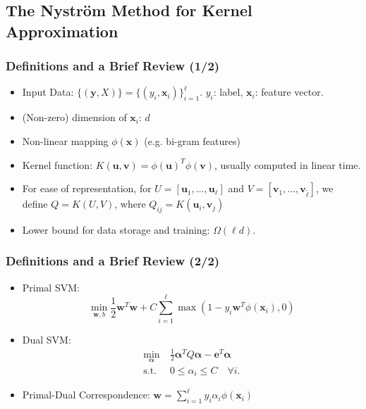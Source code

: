 \documentclass{beamer}
\def\bw{{\boldsymbol w}}
\def\bu{{\boldsymbol u}}
\def\balpha{{\boldsymbol \alpha}}
\def\be{{\boldsymbol e}}
\def\bx{{\boldsymbol x}}
\def\by{{\boldsymbol y}}
\def\bv{{\boldsymbol v}}
\begin{document}
\subsection{The Nystr\"om Method for Kernel Approximation}
\begin{frame}
  \frametitle{Definitions and a Brief Review (1/2)}
  \begin{itemize}
    \item Input Data: $\{(\by, X)\} = \{(y_i, \bx_i)\}_{i=1}^\ell$. $y_i$: label, $\bx_i$: feature vector.
    \item (Non-zero) dimension of $\bx_i$: $d$
    \item Non-linear mapping $\phi(\bx)$ (e.g. bi-gram features)
    \item Kernel function: $K(\bu, \bv) = \phi(\bu)^T \phi(\bv)$, usually computed in linear time.
    \item For ease of representation, for $U = [\bu_1, \dots, \bu_\ell]$ and $V = [\bv_1, \dots, \bv_{\tilde{\ell}}]$, we define $Q = K(U, V)$, where $Q_{ij} = K(\bu_i, \bv_j)$
    \pause
    \item Lower bound for data storage and training: $\Omega(\ell d)$.
  \end{itemize}
\end{frame}

\begin{frame}
  \frametitle{Definitions and a Brief Review (2/2)}
  \begin{itemize}
    \item Primal SVM:
    \begin{equation}
      \min_{\bw, b}
      \frac{1}{2} \bw^T\bw + C\sum_{i=1}^\ell \max(1-y_i\bw^T\phi(\bx_i), 0) \nonumber
    \end{equation} 
    \item Dual SVM: 
    \begin{align}
    \min_{\balpha} \  &  \frac{1}{2} \balpha^T Q  \balpha - \be^T \balpha \nonumber \\
    \mbox{s.t.} \  & 0 \le \alpha_i \le C \quad \forall i \mbox{.} \nonumber
    \end{align}
    \item Primal-Dual Correspondence: $\bw = \sum_{i=1}^\ell y_i \alpha_i \phi(\bx_i)$ 
  \end{itemize}
\end{frame}
\end{document}
